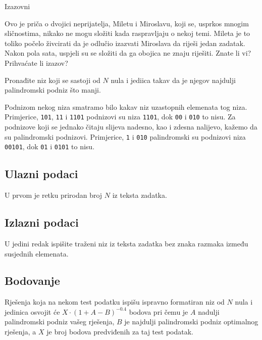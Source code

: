 \begin{statement}[
  problempoints=100,
  timelimit=1 sekunda,
  memorylimit=512 MiB,
]{Izazovni}

Ovo je priča o dvojici neprijatelja, Miletu i Miroslavu, koji se, usprkos
mnogim sličnostima, nikako ne mogu složiti kada raspravljaju o nekoj temi.
Mileta je to toliko počelo živcirati da je odlučio izazvati Miroslava da
riješi jedan zadatak.  Nakon pola sata, uspjeli su se složiti da ga obojica
ne znaju riješiti.  Znate li vi? Prihvaćate li izazov?

Pronađite niz koji se sastoji od $N$ nula i jediica takav da je njegov najdulji
palindromski podniz što manji.

Podnizom nekog niza smatramo bilo kakav niz uzastopnih elemenata tog niza.
Primjerice, \texttt{101}, \texttt{11} i \texttt{1101} podnizovi su niza
\texttt{1101}, dok \texttt{00} i \texttt{010} to nisu. Za podnizove koji se
jednako čitaju slijeva nadesno, kao i zdesna nalijevo, kažemo da su
palindromski podnizovi. Primjerice, \texttt{1} i \texttt{010} palindromski su
podnizovi niza \texttt{00101}, dok \texttt{01} i \texttt{0101} to nisu.

\subsection*{Ulazni podaci}
U prvom je retku prirodan broj $N$ iz teksta zadatka.

\subsection*{Izlazni podaci}
U jedini redak ispišite traženi niz iz teksta zadatka bez znaka razmaka
između susjednih elemenata.

\subsection*{Bodovanje}
Rješenja koja na nekom test podatku ispišu ispravno formatiran niz od $N$ nula
i jedinica osvojit će $X\cdot(1+A-B)^{-0.4}$ bodova pri čemu je $A$ nadulji
palindromski podniz vašeg rješenja, $B$ je najdulji palindromski podniz
optimalnog rješenja, a $X$ je broj bodova predviđenih za taj test podatak.


\end{statement}
